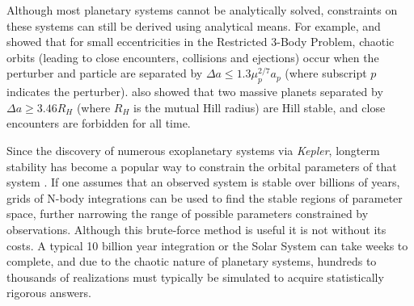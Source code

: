 \documentclass[12pt,letter]{aastex}
\newcommand{\kep}{{\it Kepler}\xspace}
\begin{document}
Although most planetary systems cannot be analytically solved, constraints on these systems can still be derived using analytical means.
For example, \citet{Wisdom1980} and \citet{Duncan1989} showed that for small eccentricities in the Restricted 3-Body Problem, chaotic orbits (leading to close encounters, collisions and ejections) occur when the perturber and particle are separated by $\Delta a \le 1.3\mu_p^{2/7}a_p$ (where subscript $p$ indicates the perturber). 
\citet{Gladman1993} also showed that two massive planets separated by $\Delta a \ge 3.46 R_H$ (where $R_H$ is the mutual Hill radius) are Hill stable, and close encounters are forbidden for all time. 

Since the discovery of numerous exoplanetary systems via \kep, longterm stability has become a popular way to constrain the orbital parameters of that system \citep{Lissauer2011, Steffen2013, Jontof-Hutter2014, Tamayo2015}. 
If one assumes that an observed system is stable over billions of years, grids of N-body integrations can be used to find the stable regions of parameter space, further narrowing the range of possible parameters constrained by observations. 
Although this brute-force method is useful it is not without its costs. 
A typical 10 billion year integration or the Solar System can take weeks to complete, and due to the chaotic nature of planetary systems, hundreds to thousands of realizations must typically be simulated to acquire statistically rigorous answers. 



\end{document}
